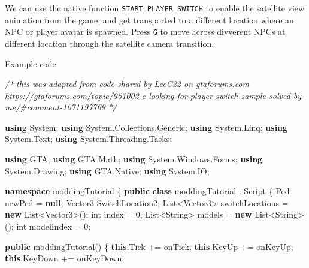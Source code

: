 \documentclass[
  openany]{book}
\newenvironment{Shaded}{\begin{snugshade}}{\end{snugshade}}
\newcommand{\CommentTok}[1]{\textcolor[rgb]{0.56,0.35,0.01}{\textit{#1}}}
\newcommand{\DataTypeTok}[1]{\textcolor[rgb]{0.13,0.29,0.53}{#1}}
\newcommand{\DecValTok}[1]{\textcolor[rgb]{0.00,0.00,0.81}{#1}}
\newcommand{\FunctionTok}[1]{\textcolor[rgb]{0.00,0.00,0.00}{#1}}
\newcommand{\KeywordTok}[1]{\textcolor[rgb]{0.13,0.29,0.53}{\textbf{#1}}}
\newcommand{\NormalTok}[1]{#1}
\begin{document}
We can use the native function \texttt{START\_PLAYER\_SWITCH} to enable the satellite view animation from the game, and get transported to a different location where an NPC or player avatar is spawned. Press \texttt{G} to move across divverent NPCs at different location through the satellite camera transition.

Example code

\begin{Shaded}
\begin{Highlighting}[]
    
\CommentTok{/*}
\CommentTok{    this was adapted from code shared by LeeC22 on gtaforums.com}
\CommentTok{    https://gtaforums.com/topic/951002-c-looking-for-player-switch-sample-solved-by-me/#comment-1071197769}
\CommentTok{*/}
    
\KeywordTok{using}\NormalTok{ System;}
\KeywordTok{using}\NormalTok{ System.}\FunctionTok{Collections}\NormalTok{.}\FunctionTok{Generic}\NormalTok{;}
\KeywordTok{using}\NormalTok{ System.}\FunctionTok{Linq}\NormalTok{;}
\KeywordTok{using}\NormalTok{ System.}\FunctionTok{Text}\NormalTok{;}
\KeywordTok{using}\NormalTok{ System.}\FunctionTok{Threading}\NormalTok{.}\FunctionTok{Tasks}\NormalTok{;}

\KeywordTok{using}\NormalTok{ GTA;}
\KeywordTok{using}\NormalTok{ GTA.}\FunctionTok{Math}\NormalTok{;}
\KeywordTok{using}\NormalTok{ System.}\FunctionTok{Windows}\NormalTok{.}\FunctionTok{Forms}\NormalTok{;}
\KeywordTok{using}\NormalTok{ System.}\FunctionTok{Drawing}\NormalTok{;}
\KeywordTok{using}\NormalTok{ GTA.}\FunctionTok{Native}\NormalTok{;}
\KeywordTok{using}\NormalTok{ System.}\FunctionTok{IO}\NormalTok{;}


\KeywordTok{namespace}\NormalTok{ moddingTutorial}
\NormalTok{\{}
    \KeywordTok{public} \KeywordTok{class}\NormalTok{ moddingTutorial : Script}
\NormalTok{    \{}
\NormalTok{        Ped newPed = }\KeywordTok{null}\NormalTok{;}
\NormalTok{        Vector3 SwitchLocation2;}
\NormalTok{        List<Vector3> switchLocations = }\KeywordTok{new}\NormalTok{ List<Vector3>();}
        \DataTypeTok{int}\NormalTok{ index = }\DecValTok{0}\NormalTok{;}
\NormalTok{        List<String> models = }\KeywordTok{new}\NormalTok{ List<String>();}
        \DataTypeTok{int}\NormalTok{ modelIndex = }\DecValTok{0}\NormalTok{;}

        \KeywordTok{public} \FunctionTok{moddingTutorial}\NormalTok{()}
\NormalTok{        \{}
            \KeywordTok{this}\NormalTok{.}\FunctionTok{Tick}\NormalTok{ += onTick;}
            \KeywordTok{this}\NormalTok{.}\FunctionTok{KeyUp}\NormalTok{ += onKeyUp;}
            \KeywordTok{this}\NormalTok{.}\FunctionTok{KeyDown}\NormalTok{ += onKeyDown;}


\end{Highlighting}
\end{Shaded}
\end{document}
